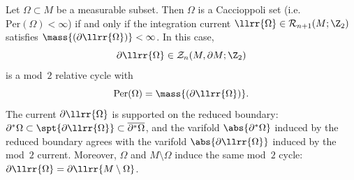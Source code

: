 \begin{proposition}\label{prop:cacc-cycle}
Let $\Omega \subset M$ be a measurable subset. Then $\Omega$ is a Caccioppoli set (i.e.\ $\mathrm{Per}(\Omega) < \infty$) if and only if the integration current $\llrr{\Omega} \in \mathcal{R}_{n + 1}(M; \Z_2)$ satisfies $\mass{(\partial\llrr{\Omega})} < \infty$. In this case,
\begin{equation*}
    \partial\llrr{\Omega} \in \mathcal{Z}_n(M, \partial M;\Z_2)
\end{equation*}
is a mod~$2$ relative cycle with
\begin{equation*}
    \mathrm{Per}(\Omega) = \mass{(\partial\llrr{\Omega})}.
\end{equation*}
The current $\partial\llrr{\Omega}$ is supported on the reduced boundary: $\partial^*\Omega \subset \spt{\partial\llrr{\Omega}}\subset\overline{\partial^*\Omega}$, and the varifold $\abs{\partial^*\Omega}$ induced by the reduced boundary agrees with the varifold $\abs{\partial\llrr{\Omega}}$ induced by the mod~$2$ current. Moreover, $\Omega$ and $M\setminus \Omega$ induce the same mod~$2$ cycle: $\partial\llrr{\Omega} = \partial\llrr{M\setminus \Omega}$.
\end{proposition}

